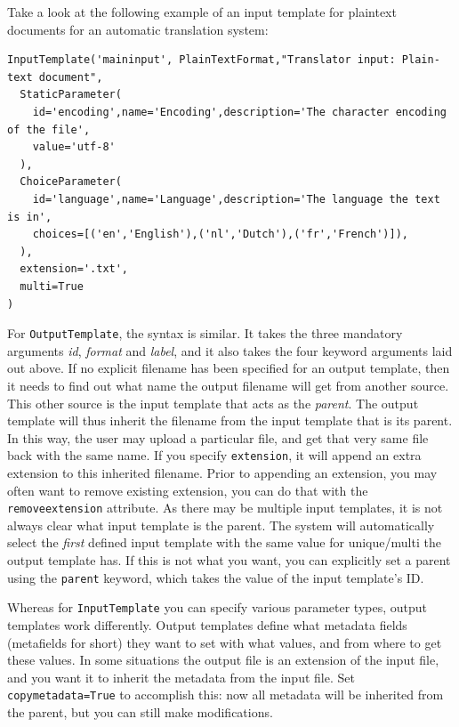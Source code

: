 \documentclass[a4paper,12pt]{report}
\begin{document}
Take a look at the following example of an input template for plaintext documents for an automatic translation system:

{\footnotesize{
\begin{verbatim}
InputTemplate('maininput', PlainTextFormat,"Translator input: Plain-text document",  
  StaticParameter(
    id='encoding',name='Encoding',description='The character encoding of the file', 
    value='utf-8'
  ),  
  ChoiceParameter(
    id='language',name='Language',description='The language the text is in', 
    choices=[('en','English'),('nl','Dutch'),('fr','French')]),
  ),      
  extension='.txt',
  multi=True
)
\end{verbatim}
}}


For \texttt{OutputTemplate}, the syntax is similar. It takes the three mandatory arguments \emph{id}, \emph{format} and \emph{label}, and it also takes the four keyword arguments laid out above. If no explicit filename has been specified for an output template, then it needs to find out what name the output filename will get from another source. This other source is the input template that acts as the \emph{parent}. The output template will thus inherit the filename from the input template that is its parent. In this way, the user may upload a particular file, and get that very same file back with the same name. If you specify \texttt{extension}, it will append an extra extension to this inherited filename. Prior to appending an extension, you may often want to remove existing extension, you can do that with the \texttt{removeextension} attribute. 
As there may be multiple input templates, it is not always clear what input template is the parent. The system will automatically select the \emph{first} defined input template with the same value for unique/multi the output template has. If this is not what you want, you can explicitly set a parent using the \texttt{parent} keyword, which takes the value of the input template's ID.

Whereas for \texttt{InputTemplate} you can specify various parameter types, output templates work differently. Output templates define what metadata fields (metafields for short) they want to set with what values, and from where to get these values. In some situations the output file is an extension of the input file, and you want it to inherit the metadata from the input file. Set \texttt{copymetadata=True} to accomplish this: now all metadata will be inherited from the parent, but you can still make modifications.
\end{document}
